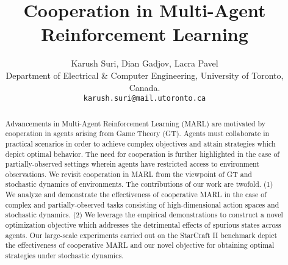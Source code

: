 \documentclass{article}
\title{Cooperation in Multi-Agent Reinforcement Learning}
\author{
  Karush Suri, Dian Gadjov, Lacra Pavel\\
   Department of Electrical \& Computer Engineering, University of Toronto, Canada.\\
  \texttt{karush.suri@mail.utoronto.ca}
}
\begin{document}
\maketitle

\begin{abstract}
Advancements in Multi-Agent Reinforcement Learning (MARL) are motivated by cooperation in agents arising from Game Theory (GT). Agents must collaborate in practical scenarios in order to achieve complex objectives and attain strategies which depict optimal behavior. The need for cooperation is further highlighted in the case of partially-observed settings wherein agents have restricted access to environment observations. We revisit cooperation in MARL from the viewpoint of GT and stochastic dynamics of environments. The contributions of our work are twofold. (1) We analyze and demonstrate the effectiveness of cooperative MARL in the case of complex and partially-observed tasks consisting of high-dimensional action spaces and stochastic dynamics. (2) We leverage the empirical demonstrations to construct a novel optimization objective which addresses the detrimental effects of spurious states across agents. Our large-scale experiments carried out on the StarCraft II benchmark depict the effectiveness of cooperative MARL and our novel objective for obtaining optimal strategies under stochastic dynamics. 

\end{abstract}
\end{document}
